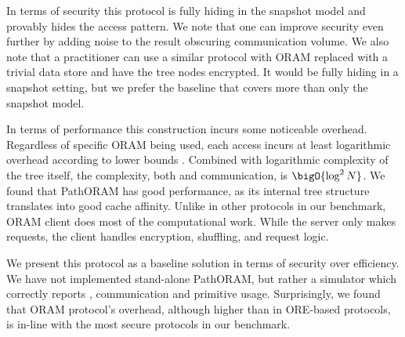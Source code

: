 		In terms of security this protocol is fully hiding in the snapshot model and provably hides the access pattern.
		We note that one can improve security even further by adding noise to the result obscuring communication volume.
		We also note that a practitioner can use a similar protocol with ORAM replaced with a trivial data store and have the tree nodes encrypted.
		It would be fully hiding in a snapshot setting, but we prefer the baseline that covers more than only the snapshot model.

		In terms of performance this construction incurs some noticeable overhead.
		Regardless of specific ORAM being used, each access incurs at least logarithmic overhead according to lower bounds \cite{oram-original}.
		Combined with logarithmic complexity of the {\BPlus} tree itself, the complexity, both {\IO} and communication, is $\bigO{\log^2 N}$.
		We found that PathORAM has good {\IO} performance, as its internal tree structure translates into good cache affinity.
		Unlike in other protocols in our benchmark, ORAM client does most of the computational work.
		While the server only makes {\IO} requests, the client handles encryption, shuffling, and request logic.

		We present this protocol as a baseline solution in terms of security over efficiency.
		We have not implemented stand-alone PathORAM, but rather a simulator which correctly reports {\IO}, communication and primitive usage.
		Surprisingly, we found that ORAM protocol's overhead, although higher than in ORE-based protocols, is in-line with the most secure protocols in our benchmark.

